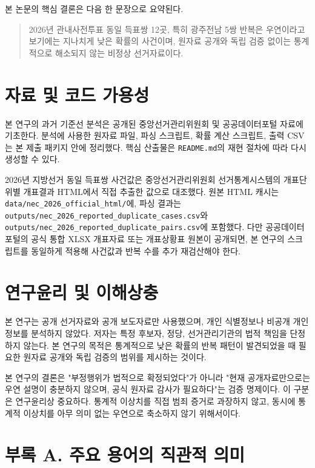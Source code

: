 \documentclass[preprint]{IEIE}
\begin{document}
본 논문의 핵심 결론은 다음 한 문장으로 요약된다.

\begin{quote}
2026년 관내사전투표 동일 득표쌍 12곳, 특히 광주전남 5쌍 반복은 우연이라고 보기에는 지나치게 낮은 확률의 사건이며, 원자료 공개와 독립 검증 없이는 통계적으로 해소되지 않는 비정상 선거자료이다.
\end{quote}

\section{자료 및 코드 가용성}

본 연구의 과거 기준선 분석은 공개된 중앙선거관리위원회 및 공공데이터포털 자료에 기초한다. 분석에 사용한 원자료 파일, 파싱 스크립트, 확률 계산 스크립트, 출력 CSV는 본 제출 패키지 안에 정리했다. 핵심 산출물은 \texttt{README.md}의 재현 절차에 따라 다시 생성할 수 있다.

2026년 지방선거 동일 득표쌍 사건값은 중앙선거관리위원회 선거통계시스템의 개표단위별 개표결과 HTML에서 직접 추출한 값으로 대조했다. 원본 HTML 캐시는 \texttt{data/nec\_2026\_official\_html/}에, 파싱 결과는 \texttt{outputs/nec\_2026\_reported\_duplicate\_cases.csv}와 \texttt{outputs/nec\_2026\_reported\_duplicate\_pairs.csv}에 포함했다. 다만 공공데이터포털의 공식 통합 XLSX 개표자료 또는 개표상황표 원본이 공개되면, 본 연구의 스크립트를 동일하게 적용해 사건값과 반복 수를 추가 재검산해야 한다.

\enlargethispage{3\baselineskip}
\section{연구윤리 및 이해상충}

본 연구는 공개 선거자료와 공개 보도자료만 사용했으며, 개인 식별정보나 비공개 개인정보를 분석하지 않았다. 저자는 특정 후보자, 정당, 선거관리기관의 법적 책임을 단정하지 않는다. 본 연구의 목적은 통계적으로 낮은 확률의 반복 패턴이 발견되었을 때 필요한 원자료 공개와 독립 검증의 범위를 제시하는 것이다.

본 연구의 결론은 "부정행위가 법적으로 확정되었다"가 아니라 "현재 공개자료만으로는 우연 설명이 충분하지 않으며, 공식 원자료 감사가 필요하다"는 검증 명제이다. 이 구분은 연구윤리상 중요하다. 통계적 이상치를 직접 범죄 증거로 과장하지 않고, 동시에 통계적 이상치를 아무 의미 없는 우연으로 축소하지 않기 위해서이다.

\clearpage
\onecolumn
\section*{부록 A. 주요 용어의 직관적 의미}
\end{document}
